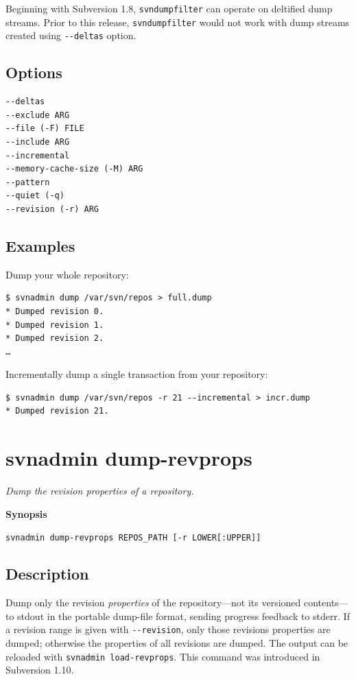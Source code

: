Beginning with Subversion 1.8, \texttt{svndumpfilter} can operate on
deltified dump streams. Prior to this release, \texttt{svndumpfilter}
would not work with dump streams created using \texttt{-\/-deltas}
option.

\subsection{Options}

\begin{verbatim}
--deltas
--exclude ARG
--file (-F) FILE
--include ARG
--incremental
--memory-cache-size (-M) ARG
--pattern
--quiet (-q)
--revision (-r) ARG
\end{verbatim}

\subsection{Examples}

Dump your whole repository:

\begin{verbatim}
$ svnadmin dump /var/svn/repos > full.dump
* Dumped revision 0.
* Dumped revision 1.
* Dumped revision 2.
…
\end{verbatim}

Incrementally dump a single transaction from your repository:

\begin{verbatim}
$ svnadmin dump /var/svn/repos -r 21 --incremental > incr.dump
* Dumped revision 21.
\end{verbatim}

\section{svnadmin
dump-revprops}\label{svn.ref.svnadmin.c.dump-revprops}

\emph{Dump the revision properties of a repository.}

\textbf{Synopsis}

\texttt{svnadmin\ dump-revprops\ REPOS\_PATH\ {[}-r\ LOWER{[}:UPPER{]}{]}}

\subsection{Description}

Dump only the revision \emph{properties} of the repository---not its
versioned contents---to stdout in the portable dump-file format, sending
progress feedback to stderr. If a revision range is given with
\texttt{-\/-revision}, only those revisions\textquotesingle{} properties
are dumped; otherwise the properties of all revisions are dumped. The
output can be reloaded with \texttt{svnadmin\ load-revprops}. This
command was introduced in Subversion 1.10.

